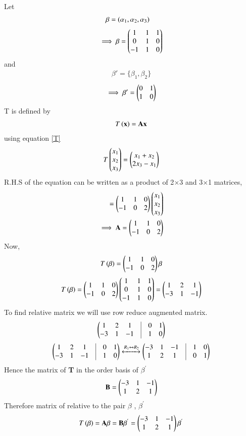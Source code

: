 Let
\begin{align}
\beta &= \left(\alpha_1,\alpha_2,\alpha_3\right)
\end{align}
\begin{align}
\implies \beta=\begin{pmatrix}1&1&1\\0&1&0\\-1&1&0\end{pmatrix}
\end{align}
and
\begin{align}
\beta' = \{\beta_1 , \beta_2\}
\end{align}
\begin{align}
\implies \beta'=\begin{pmatrix}0&1\\1&0\end{pmatrix}
\end{align}
T is defined by
\begin{align}
   T\left(\mathbf{x}\right) = \mathbf{A}\mathbf{x}
 \end{align}
using equation \eqref{T}
\begin{align}
T\begin{pmatrix}x_1\\x_2\\x_3\end{pmatrix}=\begin{pmatrix}x_1+x_2\\2x_3-x_1\end{pmatrix}
\end{align}
R.H.S of the equation can be written as a product of 2$\times$3 and 3$\times$1 matrices,
\begin{align}
=\begin{pmatrix}1&1&0\\-1&0&2\end{pmatrix}\begin{pmatrix}x_1\\x_2\\x_3\end{pmatrix}\\
\implies \mathbf{A}=\begin{pmatrix}1&1&0\\-1&0&2\end{pmatrix}
\end{align}
Now,
 \begin{align}
    T\left(\beta\right)=\begin{pmatrix}1&1&0\\-1&0&2\end{pmatrix}{\beta}
\end{align}
\begin{align}
    T\left(\beta\right)=\begin{pmatrix}1&1&0\\-1&0&2\end{pmatrix}\begin{pmatrix}1&1&1\\0&1&0\\-1&1&0\end{pmatrix}
    =\begin{pmatrix}1&2&1\\-3&1&-1\end{pmatrix}
\end{align}
To find relative matrix we will use row reduce augmented matrix.
\begin{align}
    \myvec{1&2&1&\vline&0&1\\-3&1&-1&\vline&1&0}
\end{align}
\begin{align}
\myvec{1&2&1&\vline&0&1\\-3&1&-1&\vline&1&0}\xleftrightarrow{R_1\leftrightarrow R_2}\myvec{-3&1&-1&\vline&1&0\\1&2&1&\vline&0&1}
\end{align}
Hence the matrix of \textbf{T} in the order basis of $\beta^{'}$
\begin{align}
    \mathbf{B}=\begin{pmatrix}-3&1&-1\\1&2&1\end{pmatrix}
\end{align}
 Therefore matrix of relative to the pair $\beta$ , $\beta^{'}$  
 \begin{align}
  T\left(\mathbf{\beta}\right)=\mathbf{A}\beta = \mathbf{B}\beta^{'}=\begin{pmatrix}-3&1&-1\\1&2&1\end{pmatrix}\mathbf{\beta^{'}}   
 \end{align}
